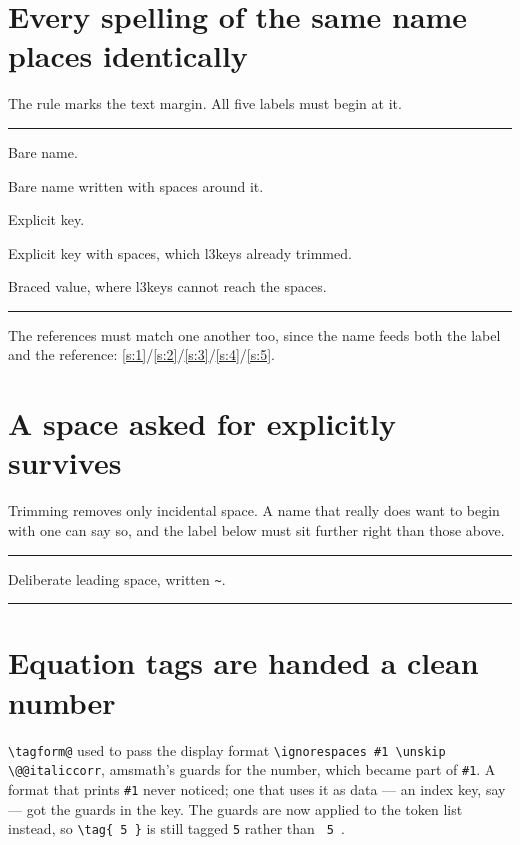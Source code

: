 \documentclass{article}
\begin{document}
\section{Every spelling of the same name places identically}

The rule marks the text margin.  All five labels must begin at it.

\noindent\rule{\textwidth}{0.3pt}
\begin{prop}
  \item[Alpha] Bare name. \label{s:1}
  \item[ Alpha ] Bare name written with spaces around it. \label{s:2}
  \item[name=Alpha] Explicit key. \label{s:3}
  \item[name = Alpha ] Explicit key with spaces, which l3keys already
    trimmed. \label{s:4}
  \item[name = { Alpha }] Braced value, where l3keys cannot reach the
    spaces. \label{s:5}
\end{prop}
\noindent\rule{\textwidth}{0.3pt}

The references must match one another too, since the name feeds both the label
and the reference: \ref{s:1}/\ref{s:2}/\ref{s:3}/\ref{s:4}/\ref{s:5}.

\section{A space asked for explicitly survives}

Trimming removes only incidental space.  A name that really does want to begin
with one can say so, and the label below must sit further right than those
above.

\noindent\rule{\textwidth}{0.3pt}
\begin{prop}
  \item[{~Alpha}] Deliberate leading space, written \verb|~|.
\end{prop}
\noindent\rule{\textwidth}{0.3pt}

\section{Equation tags are handed a clean number}

\verb|\tagform@| used to pass the display format
\verb|\ignorespaces #1 \unskip \@@italiccorr|, amsmath's guards for the number,
which became part of \verb|#1|.  A format that prints \verb|#1| never noticed;
one that uses it as data --- an index key, say --- got the guards in the key.
The guards are now applied to the token list instead, so \verb|\tag{ 5 }| is
still tagged \texttt{5} rather than \texttt{\ 5\ }.
\end{document}
